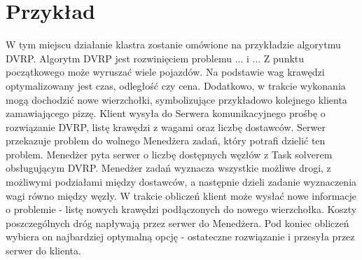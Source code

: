 \documentclass[12pt,a4paper,titlepage]{report}
\begin{document}
		\chapter{Przykład}
		W tym miejscu działanie klastra zostanie omówione na przykładzie algorytmu DVRP. Algorytm DVRP jest rozwinięciem problemu ... i ... Z punktu początkowego może wyruszać wiele pojazdów. Na podstawie wag krawędzi optymalizowany jest czas, odległość czy cena. Dodatkowo, w trakcie wykonania mogą dochodzić nowe wierzchołki, symbolizujące przykładowo kolejnego klienta zamawiającego pizzę.
		Klient wysyła do Serwera komunikacyjnego prośbę o rozwiązanie DVRP, listę krawędzi z wagami oraz liczbę dostawców. Serwer przekazuje problem do wolnego Menedżera zadań, który potrafi dzielić ten problem. Menedżer pyta serwer o liczbę dostępnych węzłów z Task solverem obsługującym DVRP.
		Menedżer zadań wyznacza wszystkie możliwe drogi, z możliwymi podziałami między dostawców, a następnie dzieli zadanie wyznaczenia wagi równo między węzły.
		W trakcie obliczeń klient może wysłać nowe informacje o problemie - listę nowych krawędzi podłączonych do nowego wierzchołka.
		Koszty poszczególnych dróg napływają przez serwer do Menedżera. Pod koniec obliczeń wybiera on najbardziej optymalną opcję - ostateczne rozwiązanie i przesyła przez serwer do klienta.
	
	
\end{document}
